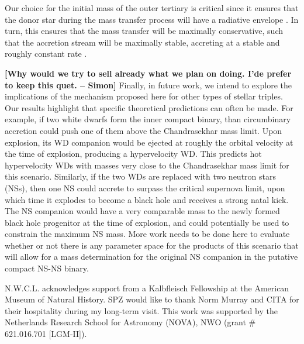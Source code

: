 \documentclass{aastex62}
\def\simon#1{{\bf {\color{red}[#1 -- Simon]}}}
\begin{document}
Our choice for the initial mass of the outer tertiary is critical since it
ensures that the donor star during the mass transfer process will have
a radiative envelope \citep[e.g.][]{maeder09}.  In turn, this ensures
that the mass transfer will be maximally conservative, such that the
accretion stream will be maximally stable, accreting at a stable and
roughly constant rate \citep[e.g.][]{iben91}.

\simon{Why would we try to sell already what we plan on doing. I'de prefer to keep this quet.}
Finally, in future work, we intend to explore the implications of the
mechanism proposed here for other types of stellar triples.  Our
results highlight that specific theoretical predictions can often be
made.  For example, if two white dwarfs form the inner compact binary,
than circumbinary accretion could push one of them above the
Chandrasekhar mass limit.  Upon explosion, its WD companion would be
ejected at roughly the orbital velocity at the time of explosion,
producing a hypervelocity WD.  This predicts hot hypervelocity WDs
with masses very close to the Chandrasekhar mass limit for this
scenario.  Similarly, if the two WDs are replaced with two neutron
stars (NSs), then one NS could accrete to surpass the critical
supernova limit, upon which time it explodes to become a black hole
and receives a strong natal kick.  The NS companion would have a very
comparable mass to the newly formed black hole progenitor at the time
of explosion, and could potentially be used to constrain the maximum
NS mass.  More work needs to be done here to evaluate whether or not
there is any parameter space for the products of this scenario that
will allow for a mass determination for the original NS companion in
the putative compact NS-NS binary.

\acknowledgments

N.W.C.L. acknowledges support from a Kalbfleisch Fellowship at the
American Museum of Natural History.  SPZ would like to thank Norm
Murray and CITA for their hospitality during my long-term visit.  This
work was supported by the Netherlands Research School for Astronomy
(NOVA), NWO (grant \# 621.016.701 [LGM-II]).





%
% 
%      
\end{document}
